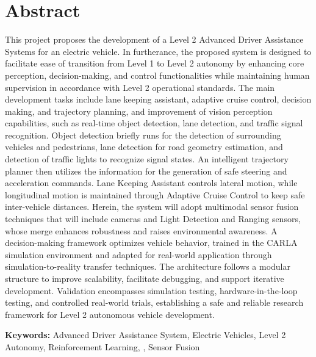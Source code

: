 \documentclass[12pt, a4paper]{report}
\begin{document}


\renewcommand{\thepage}{\roman{page}} %

\chapter*{Abstract}
This project proposes the development of a Level 2 Advanced Driver Assistance Systems for an electric vehicle. In furtherance, the proposed system is designed to facilitate ease of transition from Level 1 to Level 2 autonomy by enhancing core perception, decision-making, and control functionalities while maintaining human supervision in accordance with Level 2 operational standards. The main development tasks include lane keeping assistant, adaptive cruise control, decision making, and trajectory planning, and improvement of vision perception capabilities, such as real-time object detection, lane detection, and traffic signal recognition. Object detection briefly runs for the detection of surrounding vehicles and pedestrians, lane detection for road geometry estimation, and detection of traffic lights to recognize signal states. An intelligent trajectory planner then utilizes the information for the generation of safe steering and acceleration commands. Lane Keeping Assistant controls lateral motion, while longitudinal motion is maintained through Adaptive Cruise Control to keep safe inter-vehicle distances. Herein, the system will adopt multimodal sensor fusion techniques that will include cameras and Light Detection and Ranging sensors, whose merge enhances robustness and raises environmental awareness. A decision-making framework optimizes vehicle behavior, trained in the CARLA simulation environment and adapted for real-world application through simulation-to-reality transfer techniques. The architecture follows a modular structure to improve scalability, facilitate debugging, and support iterative development. Validation encompasses simulation testing, hardware-in-the-loop testing, and controlled real-world trials, establishing a safe and reliable research framework for Level 2 autonomous vehicle development.

\vspace{\baselineskip}
\noindent\textbf{Keywords:} Advanced Driver Assistance System, Electric Vehicles, Level 2 Autonomy, Reinforcement Learning, , Sensor Fusion

\newpage

\tableofcontents
\newpage
\end{document}
